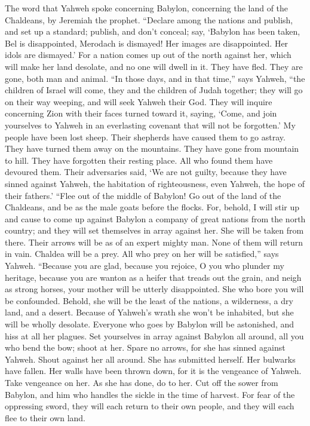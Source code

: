  The word that Yahweh spoke concerning Babylon, concerning
the land of the Chaldeans, by Jeremiah the prophet. 
``Declare among the nations and publish, and set up a standard; publish,
and don't conceal; say, `Babylon has been taken, Bel is disappointed,
Merodach is dismayed! Her images are disappointed. Her idols are
dismayed.'  For a nation comes up out of the north against
her, which will make her land desolate, and no one will dwell in it.
They have fled. They are gone, both man and animal.  ``In
those days, and in that time,'' says Yahweh, ``the children of Israel
will come, they and the children of Judah together; they will go on
their way weeping, and will seek Yahweh their God.  They
will inquire concerning Zion with their faces turned toward it, saying,
`Come, and join yourselves to Yahweh in an everlasting covenant that
will not be forgotten.'  My people have been lost sheep.
Their shepherds have caused them to go astray. They have turned them
away on the mountains. They have gone from mountain to hill. They have
forgotten their resting place.  All who found them have
devoured them. Their adversaries said, `We are not guilty, because they
have sinned against Yahweh, the habitation of righteousness, even
Yahweh, the hope of their fathers.'  ``Flee out of the
middle of Babylon! Go out of the land of the Chaldeans, and be as the
male goats before the flocks.  For, behold, I will stir up
and cause to come up against Babylon a company of great nations from the
north country; and they will set themselves in array against her. She
will be taken from there. Their arrows will be as of an expert mighty
man. None of them will return in vain.  Chaldea will be a
prey. All who prey on her will be satisfied,'' says Yahweh.
 ``Because you are glad, because you rejoice, O you who
plunder my heritage, because you are wanton as a heifer that treads out
the grain, and neigh as strong horses,  your mother will
be utterly disappointed. She who bore you will be confounded. Behold,
she will be the least of the nations, a wilderness, a dry land, and a
desert.  Because of Yahweh's wrath she won't be
inhabited, but she will be wholly desolate. Everyone who goes by Babylon
will be astonished, and hiss at all her plagues.  Set
yourselves in array against Babylon all around, all you who bend the
bow; shoot at her. Spare no arrows, for she has sinned against Yahweh.
 Shout against her all around. She has submitted herself.
Her bulwarks have fallen. Her walls have been thrown down, for it is the
vengeance of Yahweh. Take vengeance on her. As she has done, do to her.
 Cut off the sower from Babylon, and him who handles the
sickle in the time of harvest. For fear of the oppressing sword, they
will each return to their own people, and they will each flee to their
own land.

